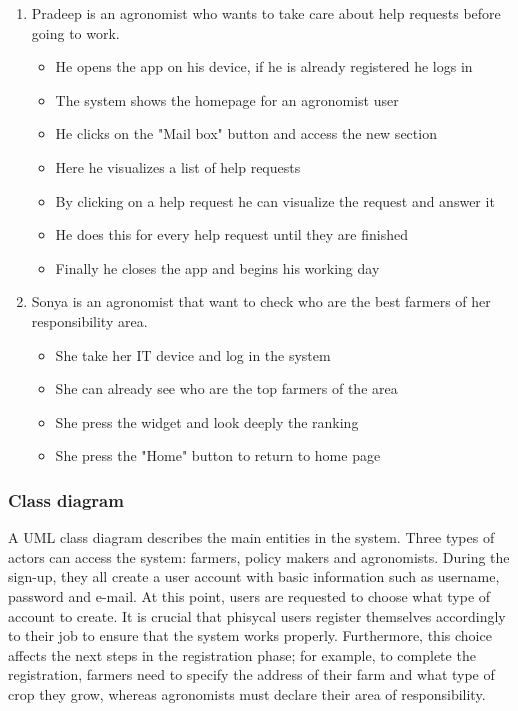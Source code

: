 \documentclass[table, 12pt]{article}
\begin{document}
\begin{enumerate}
    \item Pradeep is an agronomist who wants to take care about help requests before going to work.
    \begin{itemize}
        \item He opens the app on his device, if he is already registered he logs in
        \item The system shows the homepage for an agronomist user
        \item He clicks on the "Mail box" button and access the new section
        \item Here he visualizes a list of help requests
        \item By clicking on a help request he can visualize the request and answer it
        \item He does this for every help request until they are finished
        \item Finally he closes the app and begins his working day
    \end{itemize} 

    \item Sonya is an agronomist that want to check who are the best farmers of her responsibility area.
    \begin{itemize}
        \item She take her IT device and log in the system 
        \item She can already see who are the top farmers of the area
        \item She press the widget and look deeply the ranking
        \item She press the "Home" button to return to home page
    \end{itemize}
\end{enumerate}


\subsubsection{Class diagram}
\label{class_diagram}
A UML class diagram describes the main entities in the system.
Three types of actors can access the system: farmers, policy makers and agronomists.
During the sign-up, they all create a user account with basic information such as username, password and e-mail.
At this point, users are requested to choose what type of account to create. It is crucial that phisycal users register themselves accordingly to their job to ensure that the system works properly. Furthermore, this choice affects the next steps in the registration phase; for example, to complete the registration, farmers need to specify the address of their farm and what type of crop they grow, whereas agronomists must declare their area of responsibility.
\end{document}
